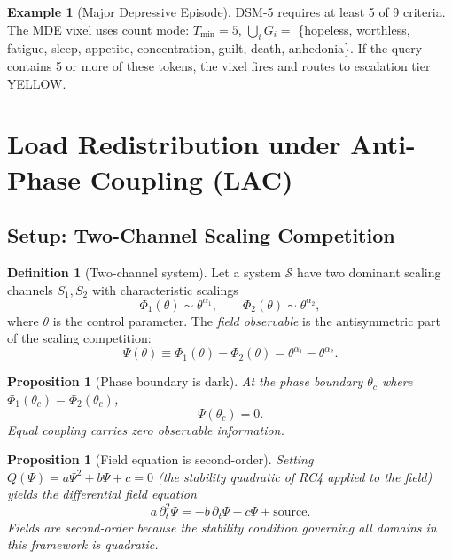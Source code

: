 \documentclass[12pt,a4paper]{article}
\theoremstyle{plain}
\newtheorem{proposition}[theorem]{Proposition}
\theoremstyle{definition}
\newtheorem{definition}[theorem]{Definition}
\newtheorem{example}[theorem]{Example}
\theoremstyle{remark}
\begin{document}
\begin{example}[Major Depressive Episode]
DSM-5 requires at least 5 of 9 criteria.  The MDE vixel uses count
mode: $T_{\min} = 5$, $\bigcup_i G_i = $ \{hopeless, worthless,
fatigue, sleep, appetite, concentration, guilt, death, anhedonia\}.
If the query contains 5 or more of these tokens, the vixel fires and
routes to escalation tier YELLOW.
\end{example}

\section{Load Redistribution under Anti-Phase Coupling (LAC)}
\label{sec:lac}

\subsection{Setup: Two-Channel Scaling Competition}

\begin{definition}[Two-channel system]
\label{def:two-channel}
Let a system $\mathcal{S}$ have two dominant scaling channels
$S_1, S_2$ with characteristic scalings
\begin{equation}
\Phi_1(\theta) \sim \theta^{\alpha_1},
\qquad
\Phi_2(\theta) \sim \theta^{\alpha_2},
\end{equation}
where $\theta$ is the control parameter.
The \emph{field observable} is the antisymmetric part of the scaling
competition:
\begin{equation}
\Psi(\theta) \equiv \Phi_1(\theta) - \Phi_2(\theta)
= \theta^{\alpha_1} - \theta^{\alpha_2}.
\label{eq:field-observable}
\end{equation}
\end{definition}

\begin{proposition}[Phase boundary is dark]
\label{prop:vacuum}
At the phase boundary $\theta_c$ where $\Phi_1(\theta_c) = \Phi_2(\theta_c)$,
\begin{equation}
\Psi(\theta_c) = 0.
\end{equation}
Equal coupling carries zero observable information.
\end{proposition}

\begin{proposition}[Field equation is second-order]
Setting $Q(\Psi) = a\Psi^2 + b\Psi + c = 0$ (the stability quadratic
of RC4 applied to the field) yields the differential field equation
\begin{equation}
a\,\partial_t^2\Psi = -b\,\partial_t\Psi - c\Psi + \text{source}.
\label{eq:field-pde}
\end{equation}
Fields are second-order because the stability condition governing all
domains in this framework is quadratic.
\end{proposition}
\end{document}
